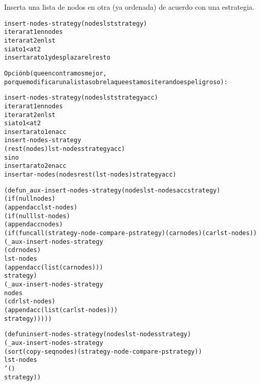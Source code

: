 \begin{aibox}{\comments}
Inserta una lista de nodos en otra (ya ordenada) de acuerdo con una estrategia.

\end{aibox}

\begin{aibox}{\pseudocode}
\begin{alltt}
   insert-nodes-strategy(nodes lst strategy)
       iterar at1 en nodes
           iterar at2 en lst
               si ato1 < at2
                   insertar ato1 y desplazar el resto

    Opción b (que encontramos mejor,
    porque modificar una lista sobre la que estamos iterando es peligroso):

    insert-nodes-strategy(nodes lst strategy acc)
       iterar at1 en nodes
           iterar at2 en lst
               si ato1 < at2
                   insertar ato1 en acc
                   insert-nodes-strategy 
                         (rest(nodes) lst-nodes strategy acc)
               sino
                   insertar ato2 en acc
                   insertar-nodes (nodes rest(lst-nodes) strategy acc)

\end{alltt}
\end{aibox}

\begin{aibox}{\code}
\begin{alltt}
(defun \_aux-insert-nodes-strategy (nodes lst-nodes acc strategy)
    (if (null nodes)
        (append acc lst-nodes)
        (if (null lst-nodes)
            (append acc nodes)
            (if  (funcall (strategy-node-compare-p strategy) (car nodes) (car lst-nodes))
                (\_aux-insert-nodes-strategy 
                    (cdr nodes)
                    lst-nodes
                    (append acc (list (car nodes)))
                    strategy)
                (\_aux-insert-nodes-strategy
                    nodes
                    (cdr lst-nodes)
                    (append acc (list (car lst-nodes)))
                    strategy)))))

(defun insert-nodes-strategy (nodes lst-nodes strategy)
    (\_aux-insert-nodes-strategy 
        (sort (copy-seq nodes) (strategy-node-compare-p strategy))
        lst-nodes 
        '() 
        strategy))




\end{alltt}
\end{aibox}
